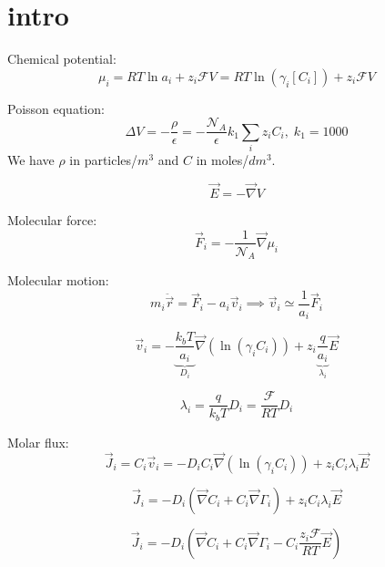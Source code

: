 \documentclass[aps,12pt]{revtex4}
\begin{document}
\section{intro}
Chemical potential:
\begin{equation}
	\mu_i = RT \ln a_i + z_i \mathcal{F} V = RT \ln (\gamma_i[C_i]) + z_i \mathcal{F} V
\end{equation}

Poisson equation:
\begin{equation}
	\Delta V = - \dfrac{\rho}{\epsilon} = -\dfrac{\mathcal{N}_A}{\epsilon} k_1 \sum_i z_i C_i,\;k_1=1000
\end{equation}
We have $\rho$ in particles/$m^3$ and $C$ in moles/$dm^3$.

\begin{equation}
	\vec{E} = -\vec{\nabla} V
\end{equation}

Molecular force:	
\begin{equation}
	\vec{F}_i = - \frac{1}{\mathcal{N}_A} \vec{\nabla} \mu_i
\end{equation}

Molecular motion:
\begin{equation}
	m_i \ddot {\vec{r}} = \vec{F}_i - a_i \vec{v}_i \implies \vec{v}_i \simeq \dfrac{1}{a_i} \vec{F}_i
\end{equation}

\begin{equation}
	\vec{v}_i = -\underbrace{\dfrac{k_bT}{a_i}}_{D_i} \vec{\nabla}(\ln(\gamma_i C_i))  + z_i \underbrace{\dfrac{ q}{a_i}}_{\lambda_i} \vec{E}
\end{equation}

\begin{equation}
	\lambda_i = \frac{q}{k_bT} D_i = \dfrac{\mathcal{F}}{RT} D_i
\end{equation}

Molar flux:
\begin{equation}
\boxed{
	\vec{J}_i = C_i\vec{v}_i = -D_i C_i \vec{\nabla}(\ln(\gamma_i C_i)) + z_i C_i \lambda_i \vec{E}
	}
\end{equation}

\begin{equation}
	\vec{J}_i = - D_i \left( \vec{\nabla} C_i + C_i \vec{\nabla}\Gamma_i \right) + z_i C_i \lambda_i \vec{E}
\end{equation}

\begin{equation}
\boxed{
	\vec{J}_i = - D_i \left( \vec{\nabla} C_i + C_i \vec{\nabla}\Gamma_i   - C_i \dfrac{ z_i\mathcal{F}}{RT} \vec{E} \right)
}
\end{equation}
\end{document}
